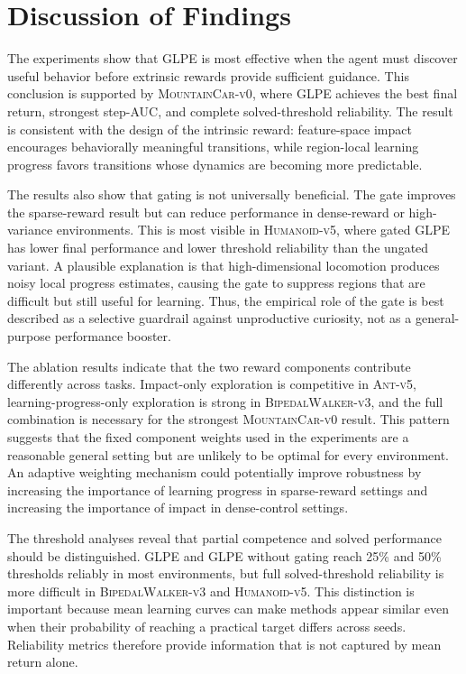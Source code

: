\section{Discussion of Findings}
\label{sec:results_discussion_of_findings}

The experiments show that GLPE is most effective when the agent must discover useful behavior before extrinsic rewards provide sufficient guidance.
This conclusion is supported by \textsc{MountainCar-v0}, where GLPE achieves the best final return, strongest step-AUC, and complete solved-threshold reliability.
The result is consistent with the design of the intrinsic reward: feature-space impact encourages behaviorally meaningful transitions, while region-local learning progress favors transitions whose dynamics are becoming more predictable.

The results also show that gating is not universally beneficial.
The gate improves the sparse-reward result but can reduce performance in dense-reward or high-variance environments.
This is most visible in \textsc{Humanoid-v5}, where gated GLPE has lower final performance and lower threshold reliability than the ungated variant.
A plausible explanation is that high-dimensional locomotion produces noisy local progress estimates, causing the gate to suppress regions that are difficult but still useful for learning.
Thus, the empirical role of the gate is best described as a selective guardrail against unproductive curiosity, not as a general-purpose performance booster.

The ablation results indicate that the two reward components contribute differently across tasks.
Impact-only exploration is competitive in \textsc{Ant-v5}, learning-progress-only exploration is strong in \textsc{BipedalWalker-v3}, and the full combination is necessary for the strongest \textsc{MountainCar-v0} result.
This pattern suggests that the fixed component weights used in the experiments are a reasonable general setting but are unlikely to be optimal for every environment.
An adaptive weighting mechanism could potentially improve robustness by increasing the importance of learning progress in sparse-reward settings and increasing the importance of impact in dense-control settings.

The threshold analyses reveal that partial competence and solved performance should be distinguished.
GLPE and GLPE without gating reach 25\% and 50\% thresholds reliably in most environments, but full solved-threshold reliability is more difficult in \textsc{BipedalWalker-v3} and \textsc{Humanoid-v5}.
This distinction is important because mean learning curves can make methods appear similar even when their probability of reaching a practical target differs across seeds.
Reliability metrics therefore provide information that is not captured by mean return alone.

